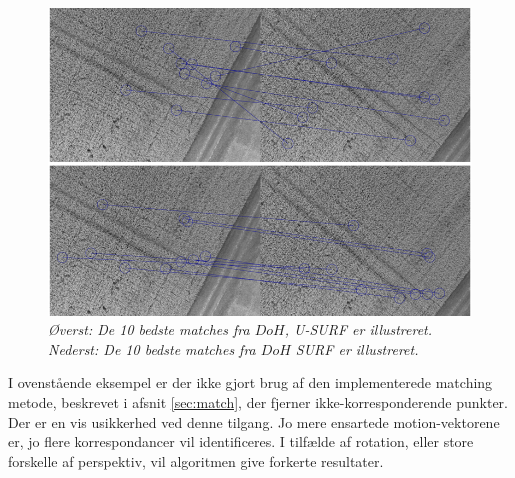 \begin{figure}[H]
    \centering
    \includegraphics[width=1\textwidth]{fig/rot2.png}
     \vspace{-1em}
    \begin{center} 
       \caption{{\footnotesize \textit{Øverst: De 10 bedste matches fra $DoH$, U-SURF er illustreret. Nederst: De 10 bedste matches fra $DoH$ SURF er illustreret. }}}
    \label{fig:rota}
     \end{center}
     \vspace{-2.5em}
  \end{figure} \noindent
I ovenstående eksempel er der ikke gjort brug af den implementerede matching metode, beskrevet i afsnit \ref{sec:match}, der fjerner ikke-korresponderende punkter.
 Der er en vis usikkerhed ved denne tilgang. 
Jo mere ensartede motion-vektorene er, jo flere korrespondancer vil identificeres. I tilfælde af rotation, eller store forskelle af perspektiv, vil algoritmen give forkerte resultater.

